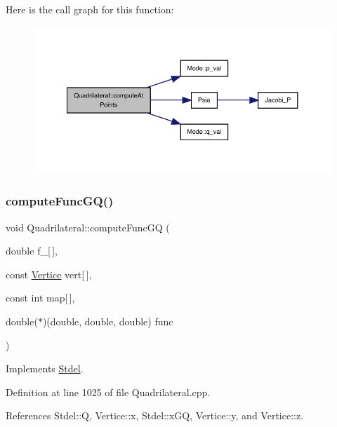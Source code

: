 Here is the call graph for this function\+:
\nopagebreak
\begin{figure}[H]
\begin{center}
\leavevmode
\includegraphics[width=350pt]{classQuadrilateral_af9b570b455246c2527fa87f186fdabb2_cgraph}
\end{center}
\end{figure}
\mbox{\label{classQuadrilateral_a3015a3c877c7fa44d130cc4029729c88}} 
\subsubsection{\texorpdfstring{compute\+Func\+G\+Q()}{computeFuncGQ()}}
{\footnotesize\ttfamily void Quadrilateral\+::compute\+Func\+GQ (\begin{DoxyParamCaption}\item[{double}]{f\+\_\+\mbox{[}$\,$\mbox{]},  }\item[{const \hyperlink{structVertice}{Vertice}}]{vert\mbox{[}$\,$\mbox{]},  }\item[{const int}]{map\mbox{[}$\,$\mbox{]},  }\item[{double($\ast$)(double, double, double)}]{func }\end{DoxyParamCaption})\hspace{0.3cm}{\ttfamily [virtual]}}



Implements \hyperlink{classStdel_a59195ad1ce9b90ef83fd935698dc3305}{Stdel}.



Definition at line 1025 of file Quadrilateral.\+cpp.



References Stdel\+::Q, Vertice\+::x, Stdel\+::x\+GQ, Vertice\+::y, and Vertice\+::z.

